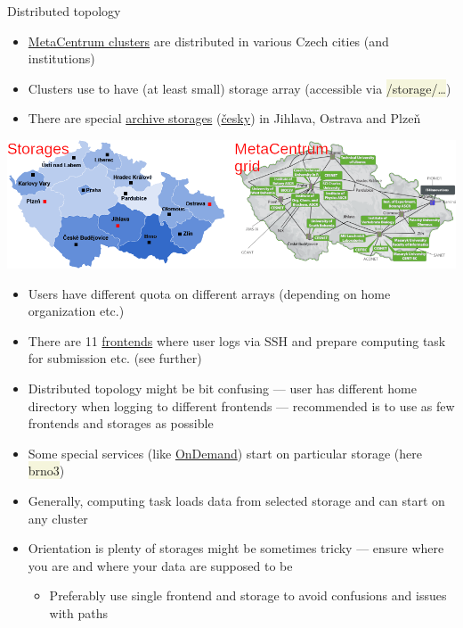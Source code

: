 \documentclass[compress, xelatex, 11pt, xcolor=svgnames, aspectratio=169,
	hyperref={
		bookmarks=true,
		unicode=true,
		colorlinks=true,
		pdftitle={Linux, command line and MetaCentrum},
		plainpages=false,
		pdfauthor={Vojtech Zeisek},
		pdfsubject={Course about use of Linux command line, writing shell scripts and using MetaCentrum of CESNET},
		pdfcreator={XeLaTeX},
		pdfkeywords={Linux, GNU, BASH, shell, command line, MetaCentrum},
		linkcolor=DarkRed, %
		anchorcolor=DarkBlue, %
		citecolor=Indigo, %
		filecolor=NavyBlue, %
		menucolor=DarkMagenta, %
		urlcolor=DarkBlue, %
		},
	url={hyphens, lowtilde} %
	]{beamer}
\renewcommand{\texttt}[1]{\colorbox{Beige}{{\ttfamily #1}}}
\begin{document}
\begin{frame}[allowframebreaks]{Distributed topology}
	\begin{itemize}
		\item \href{https://metavo.metacentrum.cz/}{MetaCentrum clusters} are distributed in various Czech cities (and institutions)
		\item Clusters use to have (at least small) storage array (accessible via \texttt{/storage/\ldots})
		\item There are special \href{https://du.cesnet.cz/en/infrastruktura_ulozist/start}{archive storages} (\href{https://du.cesnet.cz/cs/infrastruktura_ulozist/start}{česky}) in Jihlava, Ostrava and Plzeň
	\end{itemize}
	\begin{center}
		\includegraphics[width=\textwidth]{metacentrum_map.png}
	\end{center}
	\begin{itemize}
		\item Users have different quota on different arrays (depending on home organization etc.)
		\item There are 11 \href{https://docs.metacentrum.cz/computing/infrastructure/frontends/}{frontends} where user logs via SSH and prepare computing task for submission etc. (see further)
		\item Distributed topology might be bit confusing --- user has different home directory when logging to different frontends --- recommended is to use as few frontends and storages as possible
		\item Some special services (like \href{https://docs.metacentrum.cz/ondemand/}{OnDemand}) start on particular storage (here \texttt{brno3})
		\item Generally, computing task loads data from selected storage and can start on any cluster
		\item Orientation is plenty of storages might be sometimes tricky --- ensure where you are and where your data are supposed to be
		\begin{itemize}
			\item Preferably use single frontend and storage to avoid confusions and issues with paths
		\end{itemize}
	\end{itemize}
\end{frame}
\end{document}

